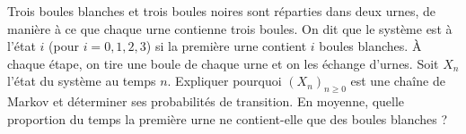 \begin{exo} Trois boules blanches et trois boules noires sont réparties dans deux urnes,
de manière à ce que chaque urne contienne trois boules. On dit que le système est à l'état
$i$ (pour $i = 0, 1, 2, 3$) si la première urne contient $i$ boules blanches. \`A chaque étape, on tire
une boule de chaque urne et on les échange d'urnes. Soit $X_n$ l'état du système au temps
$n$. Expliquer pourquoi $(X_n)_{n\geq 0}$ est une cha\^ine de Markov et déterminer ses probabilités
de transition. En moyenne, quelle proportion du temps la première urne ne contient-elle
que des boules blanches ?
\end{exo}

\bigskip


